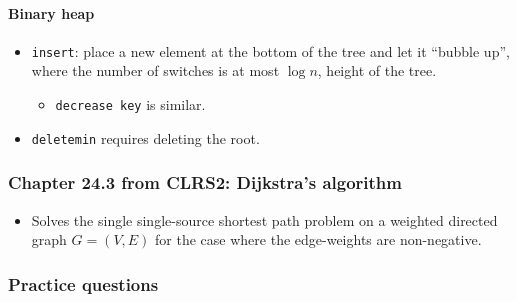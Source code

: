 \documentclass[a4paper,11pt]{article}
\begin{document}
\paragraph{Binary heap}\label{binary-heap}

\begin{itemize}
\itemsep1pt\parskip0pt
\item
  \texttt{insert}: place a new element at the bottom of the tree and let
  it ``bubble up'', where the number of switches is at most $\log n$,
  height of the tree.

  \begin{itemize}
  \itemsep1pt\parskip0pt
  \item
    \texttt{decrease key} is similar.
  \end{itemize}
\item
  \texttt{deletemin} requires deleting the root.
\end{itemize}

\subsubsection{Chapter 24.3 from CLRS2: Dijkstra's
algorithm}\label{chapter-24.3-from-clrs2-dijkstras-algorithm}

\begin{itemize}
\itemsep1pt\parskip0pt
\item
  Solves the single single-source shortest path problem on a weighted
  directed graph $G = (V, E)$ for the case where the edge-weights are
  non-negative.
\end{itemize}

\subsubsection{Practice questions}\label{practice-questions-14}
\end{document}

